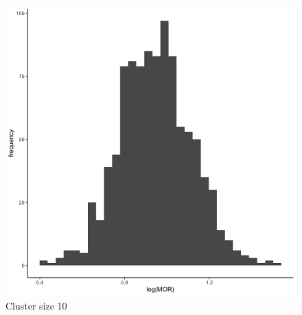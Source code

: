 \documentclass[
  letterpaper,
  DIV=11,
  numbers=noendperiod,
  titlepage]{scrartcl}
\begin{document}
\begin{figure}
\begin{minipage}[t]{0.24\linewidth}
{{\includegraphics{../../plots/two-lvl-ran-slope/high-prev/hist_100_10_two_lvl_slp_high_prev_q2.png}

}

\caption{Cluster size 10}

}

\end{minipage}%
%
\begin{minipage}[t]{0.24\linewidth}

{\centering 

}
\end{minipage}
\end{figure}
\end{document}
